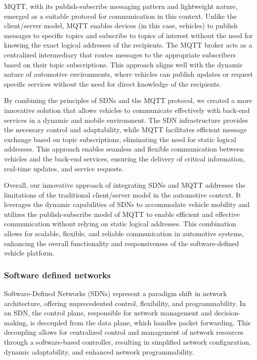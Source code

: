 \documentclass[
12pt,
oneside, 
onehalfspacing, 
nolistspacing, 
parskip, 
chapterinoneline, 
]{AASTCOMPUTER}
\begin{document}
MQTT, with its publish-subscribe messaging pattern and lightweight nature, emerged as a suitable protocol for communication in this context. Unlike the client/server model, MQTT enables devices (in this case, vehicles) to publish messages to specific topics and subscribe to topics of interest without the need for knowing the exact logical addresses of the recipients. The MQTT broker acts as a centralized intermediary that routes messages to the appropriate subscribers based on their topic subscriptions. This approach aligns well with the dynamic nature of automotive environments, where vehicles can publish updates or request specific services without the need for direct knowledge of the recipients.

By combining the principles of SDNs and the MQTT protocol, we created a more innovative solution that allows vehicles to communicate effectively with back-end services in a dynamic and mobile environment. The SDN infrastructure provides the necessary control and adaptability, while MQTT facilitates efficient message exchange based on topic subscriptions, eliminating the need for static logical addresses. This approach enables seamless and flexible communication between vehicles and the back-end services, ensuring the delivery of critical information, real-time updates, and service requests.

Overall, our innovative approach of integrating SDNs and MQTT addresses the limitations of the traditional client/server model in the automotive context. It leverages the dynamic capabilities of SDNs to accommodate vehicle mobility and utilizes the publish-subscribe model of MQTT to enable efficient and effective communication without relying on static logical addresses. This combination allows for scalable, flexible, and reliable communication in automotive systems, enhancing the overall functionality and responsiveness of the software-defined vehicle platform.

\subsubsection{Software defined networks}
Software-Defined Networks (SDNs) \cite{li2013software} represent a paradigm shift in network architecture, offering unprecedented control, flexibility, and programmability. In an SDN, the control plane, responsible for network management and decision-making, is decoupled from the data plane, which handles packet forwarding. This decoupling allows for centralized control and management of network resources through a software-based controller, resulting in simplified network configuration, dynamic adaptability, and enhanced network programmability.
\end{document}

